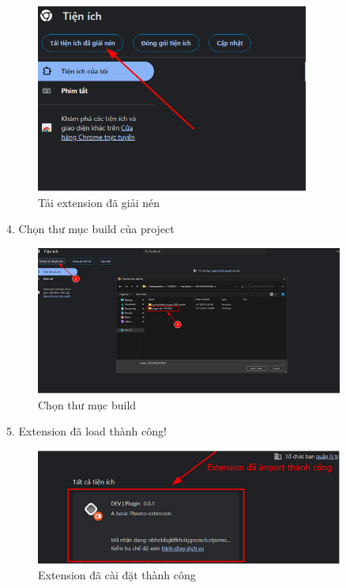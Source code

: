 \documentclass[12pt,a4paper]{article}
\begin{document}
\begin{figure}[H]
  \centering
  \includegraphics[width=0.8\textwidth]{./Images/image3.png}
  \caption{Tải extension đã giải nén}
\end{figure}

4. Chọn thư mục build của project

\begin{figure}[H]
  \centering
  \includegraphics[width=0.9\textwidth]{./Images/image6.png}
  \caption{Chọn thư mục build}
\end{figure}

5. Extension đã load thành công!

\begin{figure}[H]
  \centering
  \includegraphics[width=0.9\textwidth]{./Images/image4.png}
  \caption{Extension đã cài đặt thành công}
\end{figure}
\end{document}
